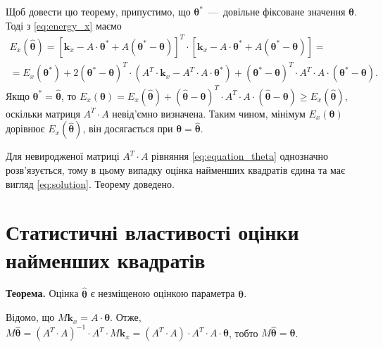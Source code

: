 Щоб довести цю теорему, припустимо, що $\boldsymbol{\theta}^*$~---~довільне фіксоване значення
$\boldsymbol{\theta}$.
Тоді з \eqref{eq:energy_x} маємо
\begin{gather*}
  E_x \left( \hat{\boldsymbol{\theta}} \right) =
  \left[
    \boldsymbol{k}_x - A \cdot \boldsymbol{\theta}^* +
    A \left( \boldsymbol{\theta}^* - \boldsymbol{\theta} \right)
  \right]^T \cdot
  \left[
    \boldsymbol{k}_x - A \cdot \boldsymbol{\theta}^* +
    A \left( \boldsymbol{\theta}^* - \boldsymbol{\theta} \right)
  \right] = \\
  = E_x \left( \boldsymbol{\theta}^* \right) +
  2 \left( \boldsymbol{\theta}^* - \boldsymbol{\theta} \right)^T \cdot
  \left( A^T \cdot \boldsymbol{k}_x - A^T \cdot A \cdot \boldsymbol{\theta}^* \right) +
  \left( \boldsymbol{\theta}^* - \boldsymbol{\theta} \right)^T \cdot A^T \cdot A \cdot
  \left( \boldsymbol{\theta}^* - \boldsymbol{\theta} \right).
\end{gather*}
Якщо $\boldsymbol{\theta}^* = \hat{\boldsymbol{\theta}}$, то
$ E_x \left( \boldsymbol{\theta} \right) =
  E_x \left( \hat{\boldsymbol{\theta}} \right) +
  \left( \hat{\boldsymbol{\theta}} - \boldsymbol{\theta} \right)^T \cdot A^T \cdot A \cdot
  \left( \hat{\boldsymbol{\theta}} - \boldsymbol{\theta} \right) \geq
  E_x \left( \hat{\boldsymbol{\theta}} \right) $,
оскільки матриця $A^T \cdot A$ невід'ємно визначена.
Таким чином, мінімум $E_x \left( \boldsymbol{\theta} \right)$ дорівнює
$E_x \left( \hat{\boldsymbol{\theta}} \right) $,
він досягається при $\boldsymbol{\theta} = \hat{\boldsymbol{\theta}}$.

Для невиродженої матриці $A^T \cdot A$ рівняння \eqref{eq:equation_theta}
однозначно розв'язується, тому
в цьому випадку оцінка найменших квадратів єдина та має вигляд
\eqref{eq:solution}.
Теорему доведено.

\section{Статистичні властивості оцінки найменших квадратів}

\textbf{Теорема.}
Оцінка $\hat{\boldsymbol{\theta}}$ є незміщеною оцінкою параметра $\boldsymbol{\theta}$.

Відомо, що $M\boldsymbol{k}_x = A \cdot \boldsymbol{\theta}$.
Отже,
$M \hat{\boldsymbol{\theta}} =
  \left( A^T \cdot A \right)^{-1} \cdot A^T \cdot M\boldsymbol{k}_x =
  \left( A^T \cdot A \right) \cdot A^T \cdot A \cdot \boldsymbol{\theta}$,
тобто $M\hat{\boldsymbol{\theta}} = \boldsymbol{\theta}$.

